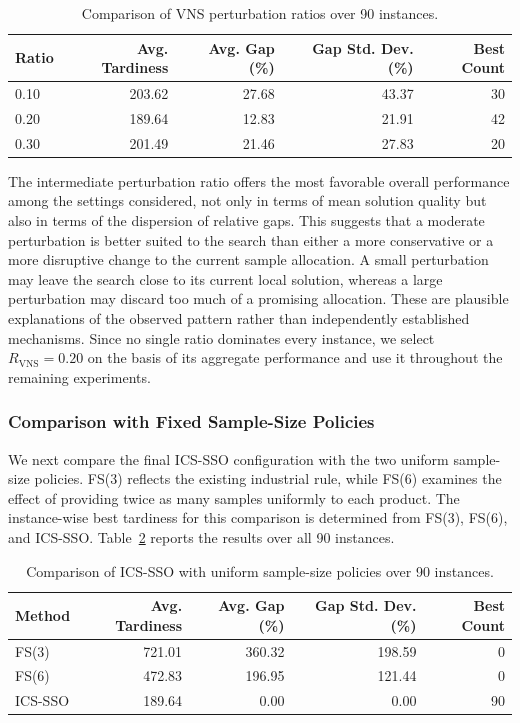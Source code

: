 \documentclass[11pt]{article}
\begin{document}
\begin{table}[H]
\centering
\caption{Comparison of VNS perturbation ratios over 90 instances.}
\label{tab:vns_ratio_comparison}
\footnotesize
\setlength{\tabcolsep}{4pt}
\begin{tabular}{lrrrr}
\hline
\textbf{Ratio} & \textbf{Avg. Tardiness} & \textbf{Avg. Gap (\%)} & \textbf{Gap Std. Dev. (\%)} & \textbf{Best Count} \\
\hline
0.10 & 203.62 & 27.68 & 43.37 & 30 \\
0.20 & 189.64 & 12.83 & 21.91 & 42 \\
0.30 & 201.49 & 21.46 & 27.83 & 20 \\
\hline
\end{tabular}
\end{table}

The intermediate perturbation ratio offers the most favorable overall performance among the settings considered, not only in terms of mean solution quality but also in terms of the dispersion of relative gaps. This suggests that a moderate perturbation is better suited to the search than either a more conservative or a more disruptive change to the current sample allocation. A small perturbation may leave the search close to its current local solution, whereas a large perturbation may discard too much of a promising allocation. These are plausible explanations of the observed pattern rather than independently established mechanisms. Since no single ratio dominates every instance, we select \(R_{\mathrm{VNS}}=0.20\) on the basis of its aggregate performance and use it throughout the remaining experiments.

\subsubsection{Comparison with Fixed Sample-Size Policies}
\label{subsubsec:fixed_sample}

We next compare the final ICS-SSO configuration with the two uniform sample-size policies. FS(3) reflects the existing industrial rule, while FS(6) examines the effect of providing twice as many samples uniformly to each product. The instance-wise best tardiness for this comparison is determined from FS(3), FS(6), and ICS-SSO. Table~\ref{tab:sample_policy_comparison} reports the results over all 90 instances.

\begin{table}[H]
\centering
\caption{Comparison of ICS-SSO with uniform sample-size policies over 90 instances.}
\label{tab:sample_policy_comparison}
\footnotesize
\setlength{\tabcolsep}{4pt}
\begin{tabular}{lrrrr}
\hline
\textbf{Method} & \textbf{Avg. Tardiness} & \textbf{Avg. Gap (\%)} & \textbf{Gap Std. Dev. (\%)} & \textbf{Best Count} \\
\hline
FS(3) & 721.01 & 360.32 & 198.59 & 0 \\
FS(6) & 472.83 & 196.95 & 121.44 & 0 \\
ICS-SSO & 189.64 & 0.00 & 0.00 & 90 \\
\hline
\end{tabular}
\end{table}
\end{document}
